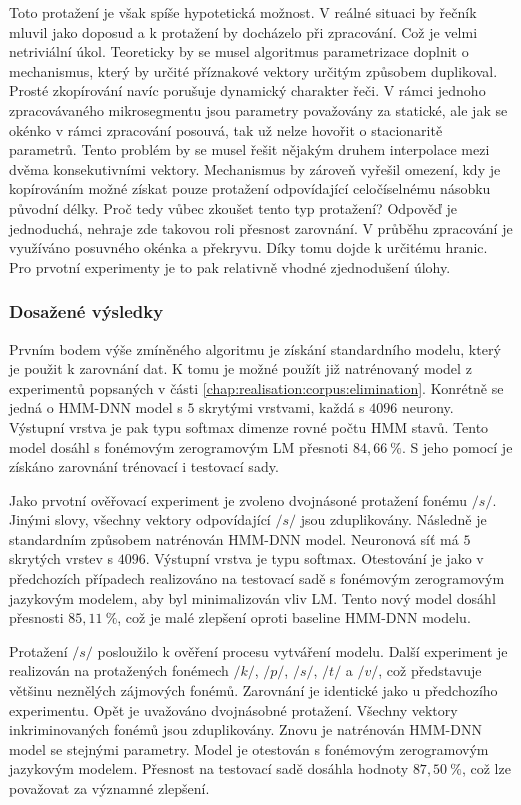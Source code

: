 Toto protažení je však spíše hypotetická možnost. V reálné situaci by řečník mluvil jako doposud a k protažení by docházelo při zpracování. Což je velmi netriviální úkol. Teoreticky by se musel algoritmus parametrizace doplnit o mechanismus, který by určité příznakové vektory určitým způsobem duplikoval. Prosté zkopírování navíc porušuje dynamický charakter řeči. V rámci jednoho zpracovávaného mikrosegmentu jsou parametry považovány za statické, ale jak se okénko v rámci zpracování posouvá, tak už nelze hovořit o stacionaritě parametrů. Tento problém by se musel řešit nějakým druhem interpolace mezi dvěma konsekutivními vektory. Mechanismus by zároveň vyřešil omezení, kdy je kopírováním možné získat pouze protažení odpovídající celočíselnému násobku původní délky. Proč tedy vůbec zkoušet tento typ protažení? Odpověď je jednoduchá, nehraje zde takovou roli přesnost zarovnání. V průběhu zpracování je využíváno posuvného okénka a překryvu. Díky tomu dojde k určitému  hranic. Pro prvotní experimenty je to pak relativně vhodné zjednodušení úlohy.

\subsubsection{Dosažené výsledky}

Prvním bodem výše zmíněného algoritmu je získání standardního modelu, který je použit k zarovnání dat. K tomu je možné použít již natrénovaný model z experimentů popsaných v části \ref{chap:realisation:corpus:elimination}. Konrétně se jedná o HMM-DNN model s $5$ skrytými vrstvami, každá s $4096$ neurony. Výstupní vrstva je pak typu softmax dimenze rovné počtu HMM stavů. Tento model dosáhl s fonémovým zerogramovým LM přesnoti $84,66\ \%$. S jeho pomocí je získáno zarovnání trénovací i testovací sady.

Jako prvotní ověřovací experiment je zvoleno dvojnásoné protažení fonému $/s/$. Jinými slovy, všechny vektory odpovídající $/s/$ jsou zduplikovány. Následně je standardním způsobem natrénován HMM-DNN model. Neuronová síť má $5$ skrytých vrstev s $4096$. Výstupní vrstva je typu softmax. Otestování je jako v předchozích případech realizováno na testovací sadě s fonémovým zerogramovým jazykovým modelem, aby byl minimalizován vliv LM. Tento nový model dosáhl přesnosti $85,11\ \%$, což je malé zlepšení oproti baseline HMM-DNN modelu.

Protažení $/s/$ posloužilo k ověření procesu vytváření modelu. Další experiment je realizován na protažených fonémech $/k/$, $/p/$, $/s/$, $/t/$ a $/v/$, což představuje většinu neznělých zájmových fonémů. Zarovnání je identické jako u předchozího experimentu. Opět je uvažováno dvojnásobné protažení. Všechny vektory inkriminovaných fonémů jsou zduplikovány. Znovu je natrénován HMM-DNN model se stejnými parametry. Model je otestován s fonémovým zerogramovým jazykovým modelem. Přesnost na testovací sadě dosáhla hodnoty $87,50\ \%$, což lze považovat za významné zlepšení.

